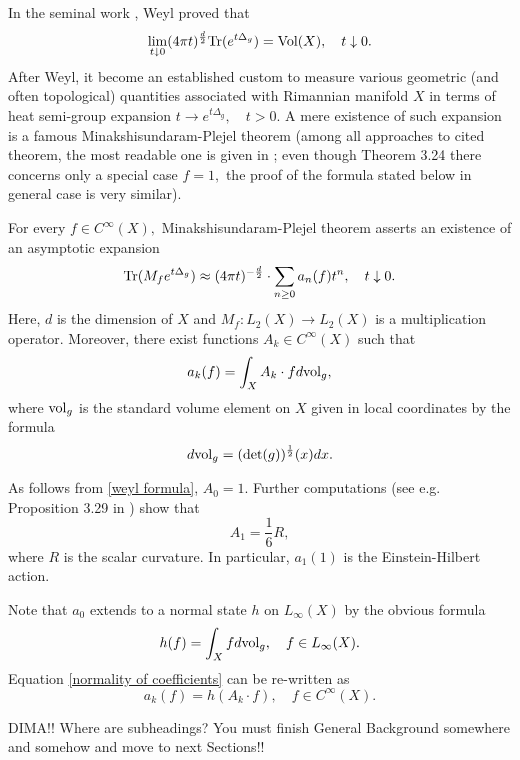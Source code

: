 \documentclass{article}
\begin{document}
In the seminal work \cite{Weyl}, Weyl proved that
\begin{equation}\label{weyl formula}
\lim_{t\downarrow0}(4\pi t)^{\frac{d}{2}}{\rm Tr}(e^{t\Delta_g})={\rm Vol}(X),\quad t\downarrow0.
\end{equation}
After Weyl, it become an established custom to measure various geometric (and often topological) quantities associated with Rimannian manifold $X$ in terms of heat semi-group expansion $t\to e^{t\Delta_g},\quad t>0.$ A mere existence of such expansion is a famous Minakshisundaram-Plejel theorem (among all approaches to cited theorem, the most readable one is given in \cite{Rosenberg}; even though Theorem 3.24 there concerns only a special case $f=1,$ the proof of the formula stated below in general case is very similar). 

For every $f\in C^{\infty}(X),$ Minakshisundaram-Plejel theorem asserts an existence of an asymptotic expansion 
\begin{equation}\label{heat asymptotic}
{\rm Tr}(M_fe^{t\Delta_g})\approx (4\pi t)^{-\frac{d}{2}}\cdot \sum_{n\geq0}a_n(f)t^n,\quad t\downarrow0.
\end{equation}
Here, $d$ is the dimension of $X$ and $M_f:L_2(X)\to L_2(X)$ is a multiplication operator. Moreover, there exist functions $A_k\in C^{\infty}(X)$ such that
\begin{equation}\label{normality of coefficients}
a_k(f)=\int_X A_k\cdot f d{\rm vol}_g,
\end{equation}
where ${\rm vol}_g$ is the standard volume element on $X$ given in local coordinates by the formula
$$d{\rm vol}_g=({\rm det}(g))^{\frac12}(x)dx.$$

As follows from \eqref{weyl formula}, $A_0=1.$ Further computations (see e.g. Proposition 3.29 in \cite{Rosenberg}) show that
$$A_1=\frac16 R,$$
where $R$ is the scalar curvature. In particular, $a_1(1)$ is the Einstein-Hilbert action.

Note that $a_0$ extends to a normal state $h$ on $L_{\infty}(X)$ by the obvious formula
$$h(f)=\int_X fd{\rm vol}_g,\quad f\in L_{\infty}(X).$$
Equation \eqref{normality of coefficients} can be re-written as
$$a_k(f)=h(A_k\cdot f),\quad f\in C^{\infty}(X).$$

{\color{red} DIMA!! Where are subheadings? You must finish General Background somewhere and somehow and move to next Sections!!}
\end{document}
